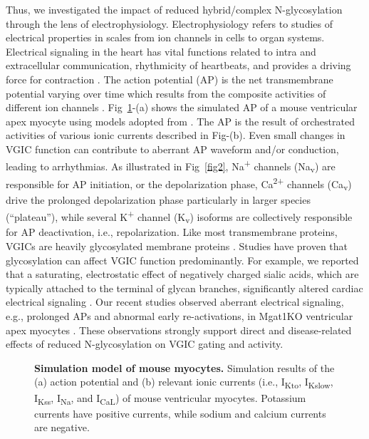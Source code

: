 \documentclass[10pt,letterpaper]{article}
\begin{document}
Thus, we investigated the impact of reduced hybrid/complex N-glycosylation through the lens of electrophysiology. Electrophysiology refers to studies of electrical properties in scales from ion channels in cells to organ systems. Electrical signaling in the heart has vital functions related to intra and extracellular communication, rhythmicity of heartbeats, and provides a driving force for contraction \cite{koenig2011voltage}. The action potential (AP) is the net transmembrane potential varying over time which results from the composite activities of different ion channels \cite{grant2009cardiac}. Fig~\ref{fig1}-(a) shows the simulated AP of a mouse ventricular apex myocyte using models adopted from \cite{bondarenko2004computer}. The AP is the result of orchestrated activities of various ionic currents described in Fig-(b). Even small changes in VGIC function can contribute to aberrant AP waveform and/or conduction, leading to arrhythmias. As illustrated in Fig~\ref{fig2}, Na\textsuperscript{+} channels (Na\textsubscript{v}) are responsible for AP initiation, or the depolarization phase, Ca\textsuperscript{2+} channels (Ca\textsubscript{v}) drive the prolonged depolarization phase particularly in larger species (“plateau”), while several K\textsuperscript{+} channel (K\textsubscript{v}) isoforms are collectively responsible for AP deactivation, i.e., repolarization. Like most transmembrane proteins, VGICs are heavily glycosylated membrane proteins \cite{ednie2011modulation}. Studies have proven that glycosylation can affect VGIC function predominantly. For example, we reported that a saturating, electrostatic effect of negatively charged sialic acids, which are typically attached to the terminal of glycan branches, significantly altered cardiac electrical signaling \cite{ednie2013expression, ednie2015reduced}. Our recent studies observed aberrant electrical signaling, e.g., prolonged APs and abnormal early re-activations, in Mgat1KO ventricular apex myocytes \cite{ednie2019reduced, ednie2019reduced2}. These observations strongly support direct and disease-related effects of reduced N-glycosylation on VGIC gating and activity.

\begin{figure}[!ht]
    \centering
    \caption{{\bf Simulation model of mouse myocytes.} 
    Simulation results of the (a) action potential and (b) relevant ionic currents (i.e., I\textsubscript{Kto}, I\textsubscript{Kslow}, I\textsubscript{Kss}, I\textsubscript{Na}, and I\textsubscript{CaL}) of mouse ventricular myocytes. Potassium currents have positive currents, while sodium and calcium currents are negative.}
    \label{fig1}
\end{figure}
\end{document}
